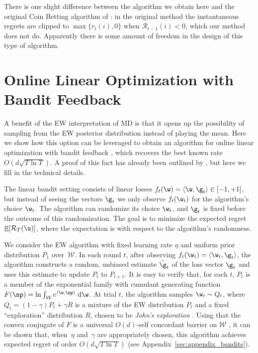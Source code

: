 \documentclass{colt2018} %
\DeclareMathOperator*{\E}{\mathbb{E}}
\newcommand{\domainw}{\mathcal{W}}
\newcommand{\inner}[2]{\langle #1, #2 \rangle}  %
\newcommand{\regret}{\mathcal{R}}
\begin{document}
There is one slight difference between the algorithm we obtain here and
the original Coin Betting algorithm of \citet{OrabonaPal2016}: in the
original method the instantaneous regrets are clipped to
$\max\{r_t(i),0\}$ when $\regret_{t-1}(i) < 0$, which our method does not do.
Apparently there is some amount of freedom in the design of this type of
algorithm.

\section{Online Linear Optimization with Bandit Feedback}
\label{sec:bandits}

A benefit of the EW interpretation of MD is 
that it opens up the possibility of sampling from
the EW posterior distribution instead of playing the mean. 
Here we show how this option can be leveraged
to obtain an algorithm for online linear optimization with 
bandit feedback \citep{Dani_et_al_2007,abernethy2008}, 
which recovers the best known rate $O(d \sqrt{T \ln T})$. 
A proof of this fact has already been outlined by \citet{bubeck2014},
but here we fill in the technical details.

The linear bandit setting consists of linear losses $f_t(\w) =
\inner{\w}{\g_t} \in [-1,+1]$, but instead of seeing the vectors
$\g_t$ we only observe $f_t(\w_t)$ for the algorithm's choice
$\w_t$. The algorithm can randomize its choice $\w_t$,
and $\g_t$ is fixed before the outcome of this randomization. The
goal is to minimize the expected regret $\E[\regret_T(\u)]$, where the
expectation is with respect to the algorithm's randomness.

We consider the EW algorithm with fixed learning rate $\eta$
and uniform prior distribution $P_1$ over~$\domainw$. In each round $t$,
after observing $f_t(\w_t) = \inner{\w_t}{\g_t}$, the algorithm
constructs a random, unbiased estimate $\tilde{\g}_t$ of the loss vector
$\g_t$ and uses this estimate to update $P_t$ to $P_{t+1}$. It is easy to
verify that, for each $t$, $P_t$ is a member of the exponential family
with cumulant generating function $F(\np) = \ln \int_{\domainw}
e^{\inner{\w}{\np}} \; \mathrm{d} \w$. At trial $t$, the algorithm
samples $\w_t \sim Q_t$, where $Q_t = (1-\gamma) P_t + \gamma R$ is a
mixture of the EW distribution $P_t$ and a fixed ``exploration''
distribution $R$, chosen to be \emph{John's exploration}
\citep{Bubeck12}. Using that the convex conjugate of $F$ is a universal
$O(d)$-self concordant barrier on $\mathcal{\domainw}$
\citep{bubeck2014}, it can be shown that, when~$\eta$ and~$\gamma$ are
appropriately chosen, this algorithm achieves expected regret of order
$O(d\sqrt{T \ln T})$ (see Appendix~\ref{sec:appendix_bandits}).
\end{document}
